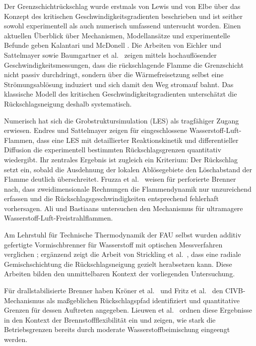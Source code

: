Der Grenzschichtrückschlag wurde erstmals von Lewis und von Elbe über das
Konzept des kritischen Geschwindigkeitsgradienten beschrieben und ist seither
sowohl experimentell als auch numerisch umfassend untersucht worden. Einen
aktuellen Überblick über Mechanismen, Modellansätze und experimentelle Befunde
geben Kalantari und McDonell \cite{Kalantari_2017}. Die Arbeiten von Eichler und
Sattelmayer \cite{Eichler_2012} sowie Baumgartner et al.\ \cite{Baumgartner_2016}
zeigen mittels hochauflösender Geschwindigkeitsmessungen, dass die
rückschlagende Flamme die Grenzschicht nicht passiv durchdringt, sondern über
die Wärmefreisetzung selbst eine Strömungsablösung induziert und sich damit den
Weg stromauf bahnt. Das klassische Modell des kritischen
Geschwindigkeitsgradienten unterschätzt die Rückschlagsneigung deshalb
systematisch.

Numerisch hat sich die Grobstruktursimulation (LES) als tragfähiger Zugang
erwiesen. Endres und Sattelmayer \cite{Endres_2018} zeigen für eingeschlossene
Wasserstoff-Luft-Flammen, dass eine LES mit detaillierter Reaktionskinetik und
differentieller Diffusion die experimentell bestimmten Rückschlagsgrenzen
quantitativ wiedergibt. Ihr zentrales Ergebnis ist zugleich ein
Kriterium: Der Rückschlag setzt ein, sobald die Ausdehnung der lokalen
Ablösegebiete den Löschabstand der Flamme deutlich überschreitet. Fruzza et al.\
\cite{Fruzza_2025} weisen für perforierte Brenner nach, dass zweidimensionale
Rechnungen die Flammendynamik nur unzureichend erfassen und die
Rückschlagsgeschwindigkeiten entsprechend fehlerhaft vorhersagen. Ali und
Bastiaans \cite{Ali_2026} untersuchen den Mechanismus für ultramagere
Wasserstoff-Luft-Freistrahlflammen.

Am Lehrstuhl für Technische Thermodynamik der FAU selbst wurden additiv
gefertigte Vormischbrenner für Wasserstoff mit optischen Messverfahren
verglichen \cite{Faderl_2026}; ergänzend zeigt die Arbeit von Strickling et al.\
\cite{Strickling_ua}, dass eine radiale Gemischschichtung die Rückschlagsneigung
gezielt herabsetzen kann. Diese Arbeiten bilden den unmittelbaren Kontext der
vorliegenden Untersuchung.

Für drallstabilisierte Brenner haben Kröner et al.\ \cite{Kroner_2003} und
Fritz et al.\ \cite{Fritz_2004} den CIVB-Mechanismus als maßgeblichen
Rückschlagspfad identifiziert und quantitative Grenzen für dessen Auftreten
angegeben. Lieuwen et al.\ \cite{Lieuwen_2008} ordnen diese Ergebnisse in den
Kontext der Brennstoffflexibilität ein und zeigen, wie stark die
Betriebsgrenzen bereits durch moderate Wasserstoffbeimischung eingeengt werden.

